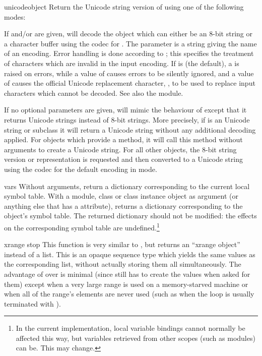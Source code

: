 \begin{funcdesc}{unicode}{object}
  Return the Unicode string version of  using one of the
  following modes:

  If  and/or  are given, 
  will decode the object which can either be an 8-bit string or a
  character buffer using the codec for . The
   parameter is a string giving the name of an encoding.
  Error handling is done according to ; this specifies the
  treatment of characters which are invalid in the input encoding.  If
   is  (the default), a
   is raised on errors, while a value of
   causes errors to be silently ignored, and a value of
   causes the official Unicode replacement character,
  , to be used to replace input characters which cannot
  be decoded.  See also the  module.

  If no optional parameters are given,  will mimic the
  behaviour of  except that it returns Unicode strings
  instead of 8-bit strings. More precisely, if  is an
  Unicode string or subclass it will return a Unicode string without
  any additional decoding applied. For objects which provide a
   method, it will call this method without
  arguments to create a Unicode string. For all other objects, the
  8-bit string version or representation is requested and then
  converted to a Unicode string using the codec for the default
  encoding in  mode.
\end{funcdesc}

\begin{funcdesc}{vars}{}
  Without arguments, return a dictionary corresponding to the current
  local symbol table.  With a module, class or class instance object
  as argument (or anything else that has a 
  attribute), returns a dictionary corresponding to the object's
  symbol table.  The returned dictionary should not be modified: the
  effects on the corresponding symbol table are undefined.\footnote{
    In the current implementation, local variable bindings cannot
    normally be affected this way, but variables retrieved from
    other scopes (such as modules) can be.  This may change.}
\end{funcdesc}

\begin{funcdesc}{xrange}{ stop}
  This function is very similar to , but returns an
  ``xrange object'' instead of a list.  This is an opaque sequence
  type which yields the same values as the corresponding list, without
  actually storing them all simultaneously.  The advantage of
   over  is minimal (since
   still has to create the values when asked for
  them) except when a very large range is used on a memory-starved
  machine or when all of the range's elements are never used (such as
  when the loop is usually terminated with ).
\end{funcdesc}

